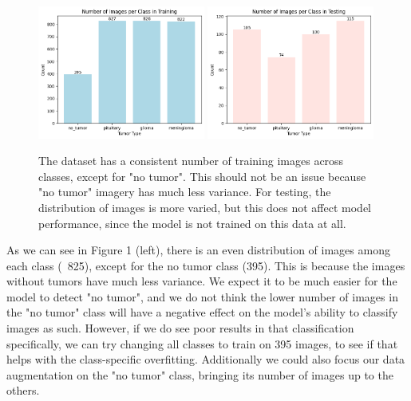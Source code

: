 \documentclass[conference]{IEEEtran}
\begin{document}
\begin{figure}[!ht]
    \centering
    \includegraphics[width=0.49\textwidth]{ImagesPerClassTraining.png}
    \hfill
    \includegraphics[width=0.49\textwidth]{ImagesPerClassTesting.png}
    \caption{\large The dataset has a consistent number of training images across classes, except for "no tumor". This should not be an issue because "no tumor" imagery has much less variance. For testing, the distribution of images is more varied, but this does not affect model performance, since the model is not trained on this data at all.}
    \label{fig:images-per-class}
\end{figure}

As we can see in Figure 1 (left), there is an even distribution of images among each class (~825), except for the no tumor class (395). This is because the images without tumors have much less variance. We expect it to be much easier for the model to detect "no tumor", and we do not think the lower number of images in the "no tumor" class will have a negative effect on the model's ability to classify images as such. However, if we do see poor results in that classification specifically, we can try changing all classes to train on 395 images, to see if that helps with the class-specific overfitting. Additionally we could also focus our data augmentation on the "no tumor" class, bringing its number of images up to the others.
\end{document}
